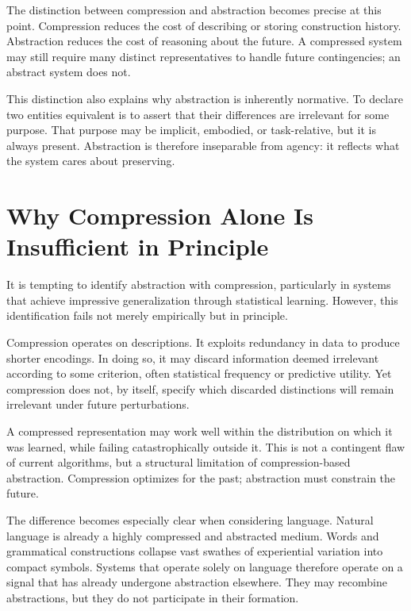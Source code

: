 \documentclass[11pt]{article}
\begin{document}
The distinction between compression and abstraction becomes precise at this point. Compression reduces the cost of describing or storing construction history. Abstraction reduces the cost of reasoning about the future. A compressed system may still require many distinct representatives to handle future contingencies; an abstract system does not.

This distinction also explains why abstraction is inherently normative. To declare two entities equivalent is to assert that their differences are irrelevant for some purpose. That purpose may be implicit, embodied, or task-relative, but it is always present. Abstraction is therefore inseparable from agency: it reflects what the system cares about preserving.

\section{Why Compression Alone Is Insufficient in Principle}

It is tempting to identify abstraction with compression, particularly in systems that achieve impressive generalization through statistical learning. However, this identification fails not merely empirically but in principle.

Compression operates on descriptions. It exploits redundancy in data to produce shorter encodings. In doing so, it may discard information deemed irrelevant according to some criterion, often statistical frequency or predictive utility. Yet compression does not, by itself, specify which discarded distinctions will remain irrelevant under future perturbations.

A compressed representation may work well within the distribution on which it was learned, while failing catastrophically outside it. This is not a contingent flaw of current algorithms, but a structural limitation of compression-based abstraction. Compression optimizes for the past; abstraction must constrain the future.

The difference becomes especially clear when considering language. Natural language is already a highly compressed and abstracted medium. Words and grammatical constructions collapse vast swathes of experiential variation into compact symbols. Systems that operate solely on language therefore operate on a signal that has already undergone abstraction elsewhere. They may recombine abstractions, but they do not participate in their formation.
\end{document}
